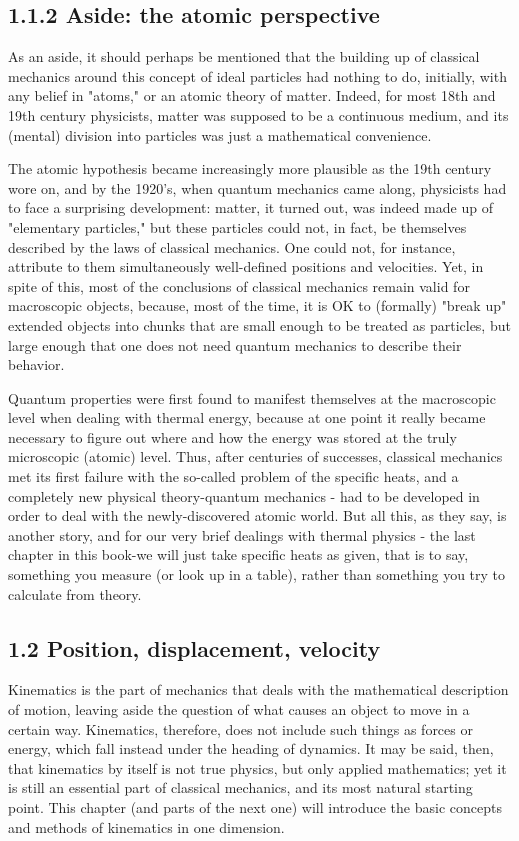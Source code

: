 \documentclass[10pt]{article}
\begin{document}
\subsection*{1.1.2 Aside: the atomic perspective}
As an aside, it should perhaps be mentioned that the building up of classical mechanics around this concept of ideal particles had nothing to do, initially, with any belief in "atoms," or an atomic theory of matter. Indeed, for most 18th and 19th century physicists, matter was supposed to be a continuous medium, and its (mental) division into particles was just a mathematical convenience.

The atomic hypothesis became increasingly more plausible as the 19th century wore on, and by the 1920's, when quantum mechanics came along, physicists had to face a surprising development: matter, it turned out, was indeed made up of "elementary particles," but these particles could not, in fact, be themselves described by the laws of classical mechanics. One could not, for instance, attribute to them simultaneously well-defined positions and velocities. Yet, in spite of this, most of the conclusions of classical mechanics remain valid for macroscopic objects, because, most of the time, it is OK to (formally) "break up" extended objects into chunks that are small enough to be treated as particles, but large enough that one does not need quantum mechanics to describe their behavior.

Quantum properties were first found to manifest themselves at the macroscopic level when dealing with thermal energy, because at one point it really became necessary to figure out where and how the energy was stored at the truly microscopic (atomic) level. Thus, after centuries of successes, classical mechanics met its first failure with the so-called problem of the specific heats, and a completely new physical theory-quantum mechanics - had to be developed in order to deal with the newly-discovered atomic world. But all this, as they say, is another story, and for our very brief dealings with thermal physics - the last chapter in this book-we will just take specific heats as given, that is to say, something you measure (or look up in a table), rather than something you try to calculate from theory.

\subsection*{1.2 Position, displacement, velocity}
Kinematics is the part of mechanics that deals with the mathematical description of motion, leaving aside the question of what causes an object to move in a certain way. Kinematics, therefore, does not include such things as forces or energy, which fall instead under the heading of dynamics. It may be said, then, that kinematics by itself is not true physics, but only applied mathematics; yet it is still an essential part of classical mechanics, and its most natural starting point. This chapter (and parts of the next one) will introduce the basic concepts and methods of kinematics in one dimension.
\end{document}
